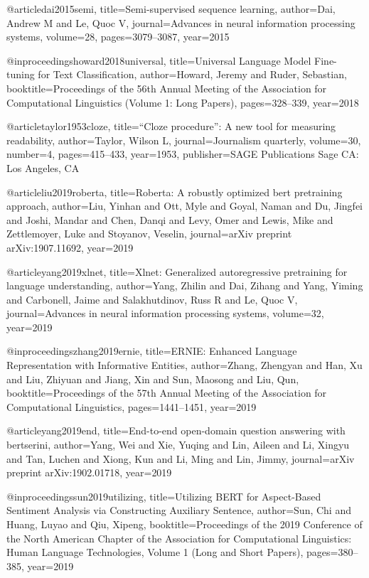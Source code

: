 @article{dai2015semi,
  title={Semi-supervised sequence learning},
  author={Dai, Andrew M and Le, Quoc V},
  journal={Advances in neural information processing systems},
  volume={28},
  pages={3079--3087},
  year={2015}
}

@inproceedings{howard2018universal,
  title={Universal Language Model Fine-tuning for Text Classification},
  author={Howard, Jeremy and Ruder, Sebastian},
  booktitle={Proceedings of the 56th Annual Meeting of the Association for Computational Linguistics (Volume 1: Long Papers)},
  pages={328--339},
  year={2018}
}

@article{taylor1953cloze,
  title={“Cloze procedure”: A new tool for measuring readability},
  author={Taylor, Wilson L},
  journal={Journalism quarterly},
  volume={30},
  number={4},
  pages={415--433},
  year={1953},
  publisher={SAGE Publications Sage CA: Los Angeles, CA}
}

@article{liu2019roberta,
  title={Roberta: A robustly optimized bert pretraining approach},
  author={Liu, Yinhan and Ott, Myle and Goyal, Naman and Du, Jingfei and Joshi, Mandar and Chen, Danqi and Levy, Omer and Lewis, Mike and Zettlemoyer, Luke and Stoyanov, Veselin},
  journal={arXiv preprint arXiv:1907.11692},
  year={2019}
}

@article{yang2019xlnet,
  title={Xlnet: Generalized autoregressive pretraining for language understanding},
  author={Yang, Zhilin and Dai, Zihang and Yang, Yiming and Carbonell, Jaime and Salakhutdinov, Russ R and Le, Quoc V},
  journal={Advances in neural information processing systems},
  volume={32},
  year={2019}
}

@inproceedings{zhang2019ernie,
  title={ERNIE: Enhanced Language Representation with Informative Entities},
  author={Zhang, Zhengyan and Han, Xu and Liu, Zhiyuan and Jiang, Xin and Sun, Maosong and Liu, Qun},
  booktitle={Proceedings of the 57th Annual Meeting of the Association for Computational Linguistics},
  pages={1441--1451},
  year={2019}
}

@article{yang2019end,
  title={End-to-end open-domain question answering with bertserini},
  author={Yang, Wei and Xie, Yuqing and Lin, Aileen and Li, Xingyu and Tan, Luchen and Xiong, Kun and Li, Ming and Lin, Jimmy},
  journal={arXiv preprint arXiv:1902.01718},
  year={2019}
}

@inproceedings{sun2019utilizing,
  title={Utilizing BERT for Aspect-Based Sentiment Analysis via Constructing Auxiliary Sentence},
  author={Sun, Chi and Huang, Luyao and Qiu, Xipeng},
  booktitle={Proceedings of the 2019 Conference of the North American Chapter of the Association for Computational Linguistics: Human Language Technologies, Volume 1 (Long and Short Papers)},
  pages={380--385},
  year={2019}
}


